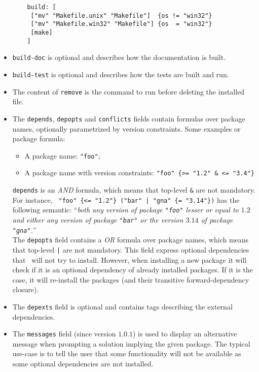 \documentclass[a4paper,10pt]{article}
\begin{document}
\begin{itemize}
  \begin{Verbatim}
    build: [
     ["mv" "Makefile.unix" "Makefile"]  {os != "win32"}
     ["mv" "Makefile.win32" "Makefile"] {os  = "win32"}
     [make]
    ]
  \end{Verbatim}

\item {\tt build-doc} is optional and describes how the documentation
  is built.

\item {\tt build-test} is optional and describes how the tests are
  built and run.

\item The content of {\tt remove} is the command to run before deleting
  the installed file.

\item The {\tt depends}, {\tt depopts} and {\tt conflicts} fields
  contain formulas over package names, optionally parametrized by
  version constraints. Some examples or package formula:

\begin{itemize}
\item A package name: {\tt "foo"};
\item A package name with version constraints:
  \verb+"foo" {>= "1.2" & <= "3.4"}+
\end{itemize}

{\tt depends} is an {\em AND} formula, which means that top-level
\verb+&+ are not mandatory. For instance,
 \verb+ "foo" {<= "1.2"} ("bar" | "gna" {= "3.14"})+ has the following
 semantic:  ``{\em both any version of package
  {\tt "foo"} lesser or equal to $1.2$ and either any version of package
  {\tt "bar"} or the version $3.14$ of package {\tt "gna"}.}''  \\

The {\tt depopts} field contains a {\em OR} formula over
  package names, which means that top-level \verb+|+ are not
  mandatory. This field express optional dependencies that
  \OPAM\ will not try to install. However, when installing a new
  package it will check if it is an optional dependency of already
  installed packages. If it is the case, it will re-install the
  packages (and their transitive forward-dependency closure).

\item The {\tt depexts} field is optional and contains tags describing
  the external dependencies.

\item The {\tt messages} field (since version $1.0.1$) is used to
  display an alternative message when prompting a solution implying
  the given package. The typical use-case is to tell the user that
  some functionality will not be available as some optional
  dependencies are not installed.


\end{itemize}
\end{document}
